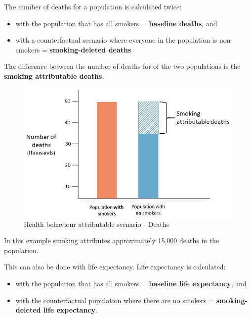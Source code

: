 \documentclass[]{book}
\providecommand{\tightlist}{%
  \setlength{\itemsep}{0pt}\setlength{\parskip}{0pt}}
\begin{document}
The number of deaths for a population is calculated twice:

\begin{itemize}
\tightlist
\item
  with the population that has all smokers = \textbf{baseline deaths},
  and
\item
  with a counterfactual scenario where everyone in the population is
  non-smokers = \textbf{smoking-deleted deaths}
\end{itemize}

The difference between the number of deaths for of the two populations
is the \textbf{smoking attributable deaths}.

\begin{figure}

{\centering \includegraphics{Images/HB attributable number of deaths} 

}

\caption{Health behaviour attributable scenario - Deaths}\label{fig:unnamed-chunk-49}
\end{figure}

In this example smoking attributes approximately 15,000 deaths in the
population.

This can also be done with life expectancy. Life expectancy is
calculated:

\begin{itemize}
\tightlist
\item
  with the population that has all smokers = \textbf{baseline life
  expectancy}, and
\item
  with the counterfactual population where there are no smokers =
  \textbf{smoking-deleted life expectancy}.
\end{itemize}
\end{document}
